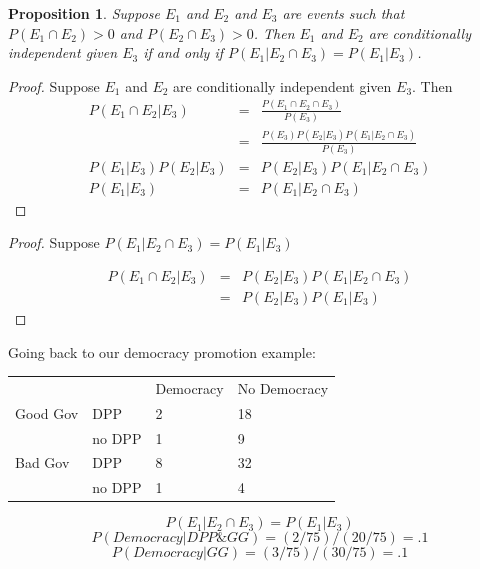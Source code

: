 \documentclass{beamer}
\newtheorem{prop}{Proposition}
\numberwithin{equation}{section}
\begin{document}
\begin{frame}

\begin{prop}
Suppose $E_{1}$ and $E_{2}$ and $E_{3}$ are events such that $P(E_{1} \cap E_{2})>0$ and $P(E_{2} \cap E_{3}) >0$.  Then $E_{1}$ and $E_{2}$ are conditionally independent given $E_{3} $ if and only if $P(E_{1} | E_{2} \cap E_{3})  = P(E_{1} | E_{3}) $.  
\end{prop}

\begin{proof}
Suppose $E_{1}$ and $E_{2}$ are conditionally independent given $E_{3}$.  Then 
\begin{eqnarray}
P(E_{1} \cap E_{2} |  E_{3}) & = & \frac{P(E_{1} \cap E_{2} \cap E_{3}  ) }{P(E_{3} )} \nonumber \\
& = & \frac{P(E_{3})P(E_{2} | E_{3} )P(E_{1} | E_{2} \cap E_{3} ) }{ P(E_{3} )}\nonumber \\
P(E_{1}|E_{3}) P(E_{2} | E_{3} ) & = & P(E_{2} | E_{3} )P(E_{1} | E_{2} \cap E_{3} )\nonumber \\
P(E_{1}|E_{3}) & = & P(E_{1} | E_{2} \cap E_{3} ) \nonumber 
\end{eqnarray}

\end{proof}





\end{frame}

\begin{frame}

\begin{proof}
Suppose $P(E_{1} | E_{2} \cap E_{3})  = P(E_{1} | E_{3}) $

\begin{eqnarray}
P(E_{1} \cap E_{2}| E_{3 } ) & = & P(E_{2} | E_{3} ) P(E_{1} | E_{2}\cap E_{3} ) \nonumber \\
 & = & P(E_{2} | E_{3} ) P(E_{1} | E_{3} ) \nonumber 
\end{eqnarray}

\end{proof}

\end{frame}




\begin{frame}
Going back to our democracy promotion example:
\begin{table}
\begin{tabular}{llll}
		&&Democracy& No Democracy\\
 Good Gov & DPP &2 & 18\\
		 &no DPP & 1& 9\\
		 \hline
Bad Gov  & DPP &8 & 32\\
		&no DPP & 1& 4\\
\end{tabular}
\end{table}

$$P(E_{1} | E_{2} \cap E_{3})  = P(E_{1} | E_{3}) $$ 
$$P(Democracy| DPP\& GG) = (2/75)/(20/75)=.1$$
$$P(Democracy| GG) = (3/75)/(30/75)=.1$$

\end{frame}
\end{document}
